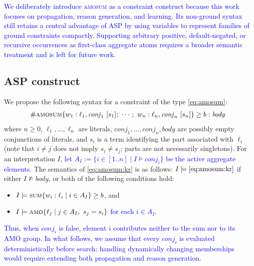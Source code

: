 \documentclass[preprint,authoryear]{elsarticle}
\theoremstyle{definition}
\def\amosum{\ensuremath{\textsc{amosum}}\xspace}
\begin{document}
\textcolor{blue}{We deliberately introduce \textsc{amosum} as a constraint construct because this work focuses on propagation, reason generation, and learning. Its non-ground syntax still retains a central advantage of ASP by using variables to represent families of ground constraints compactly. Supporting arbitrary positive, default-negated, or recursive occurrences as first-class aggregate atoms requires a broader semantic treatment and is left for future work.}

\subsection{ASP construct}
\label{sub:sec:asp:const}

We propose the following syntax for a constraint of the type \eqref{eq:amosum}:
\begin{align}\label{eq:amosum:kr}
    \#\amosum\{w_1 : \ell_1, \mathit{conj}_1 \ [s_1];\ \cdots;\ w_n : \ell_n, \mathit{conj}_n\ [s_n]\} \ge b : \mathit{body}
\end{align}
where $n \geq 0$, $\ell_1,\ldots,\ell_n$ are literals, $\mathit{conj}_1,\ldots,\mathit{conj_n},\mathit{body}$ are possibly empty conjunctions of literals,
and $s_i$ is a term identifying the part associated with $\ell_i$ (note that $i \neq j$ does not imply $s_i \neq s_j$; parts are not necessarily singletons).
For an interpretation $I$, \textcolor{blue}{let $A_I:=\{i\in[1..n]\mid I\models\mathit{conj}_i\}$ be the active aggregate elements}. The semantics of \eqref{eq:amosum:kr} is as follows: $I \models \eqref{eq:amosum:kr}$ if either $I \not\models \mathit{body}$, or both of the following conditions hold:
\begin{itemize}
\item 
\textcolor{blue}{$I \models \textsc{sum}\{w_i : \ell_i \mid i\in A_I\} \ge b$}, and

\item
\textcolor{blue}{$I \models \textsc{amo}\{\ell_j \mid j\in A_I,\ s_j=s_i\}$ for each $i\in A_I$.}
\end{itemize}
\textcolor{blue}{Thus, when $\mathit{conj}_i$ is false, element $i$ contributes neither to the sum nor to its AMO group. In what follows, we assume that every $\mathit{conj}_i$ is evaluated deterministically before search; handling dynamically changing memberships would require extending both propagation and reason generation.}
\end{document}
